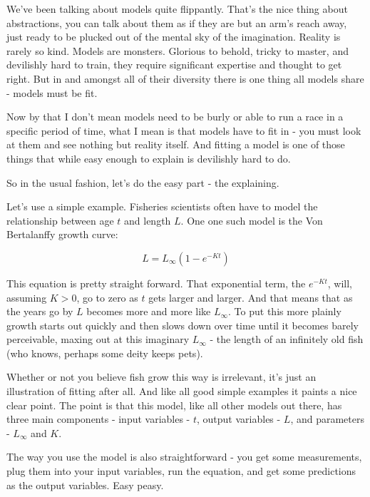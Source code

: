 \documentclass[11pt,a5paper]{book}
\begin{document}
We've been talking about models quite flippantly. That's the nice thing about abstractions, you can talk about them as if they are but an arm's reach away, just ready to be plucked out of the mental sky of the imagination. Reality is rarely so kind. Models are monsters. Glorious to behold, tricky to master, and devilishly hard to train, they require significant expertise and thought to get right. But in and amongst all of their diversity there is one thing all models share - models must be fit.
\newline

Now by that I don't mean models need to be burly or able to run a race in a specific period of time, what I mean is that models have to fit in - you must look at them and see nothing but reality itself. And fitting a model is one of those things that while easy enough to explain is devilishly hard to do. 
\newline

So in the usual fashion, let's do the easy part - the explaining. 
\newline

Let's use a simple example. Fisheries scientists often have to model the relationship between age $t$ and length $L$. One one such model is the Von Bertalanffy growth curve:

$$L = L_{\infty}(1-e^{-Kt})$$

This equation is pretty straight forward. That exponential term, the $e^{-Kt}$, will, assuming $K>0$, go to zero as $t$ gets larger and larger. And that means that as the years go by $L$ becomes more and more like $L_{\infty}$. To put this more plainly growth starts out quickly and then slows down over time until it becomes barely perceivable, maxing out at this imaginary $L_{\infty}$ - the length of an infinitely old fish (who knows, perhaps some deity keeps pets). 
\newline

Whether or not you believe fish grow this way is irrelevant, it's just an illustration of fitting after all. And like all good simple examples it paints a nice clear point. The point is that this model, like all other models out there, has three main components - input variables - $t$, output variables - $L$, and parameters - $L_{\infty}$ and $K$. 
\newline

The way you use the model is also straightforward - you get some measurements, plug them into your input variables, run the equation, and get some predictions as the output variables. Easy peasy. 
\newline
\end{document}
